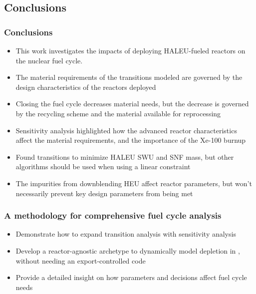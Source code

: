 \subsection{Conclusions}
\begin{frame}
      \frametitle{Conclusions}
      \begin{itemize}
        \item This work investigates the impacts of deploying \gls{HALEU}-fueled 
              reactors on the nuclear fuel cycle.
        \item<2-> The material requirements of the transitions modeled are governed 
              by the design characteristics of the reactors deployed
        \item<2-> Closing the fuel cycle decreases material needs, but the 
              decrease is governed by the recycling scheme and the 
              material available for reprocessing
        \item<3-> Sensitivity analysis highlighted how the 
              advanced reactor characteristics affect the material requirements, and 
              the importance of the Xe-100 burnup
        \item<3-> Found transitions to minimize \gls{HALEU} \gls{SWU} 
              and \gls{SNF} mass, but other algorithms should 
              be used when using a linear constraint
        \item<4-> The impurities from downblending \gls{HEU} affect 
              reactor parameters, but won't necessarily prevent key design 
              parameters from being met
      \end{itemize}
\end{frame}

\begin{frame}
      \frametitle{A methodology for comprehensive fuel cycle analysis}
      \begin{itemize}
            \item Demonstrate how to expand transition analysis with 
                  sensitivity analysis
            \item Develop a reactor-agnostic archetype to dynamically model depletion 
                  in \Cyclus, without needing an export-controlled code
            \item<2-> Provide a detailed insight on how parameters and 
                  decisions affect fuel cycle needs
      \end{itemize}
\end{frame}

